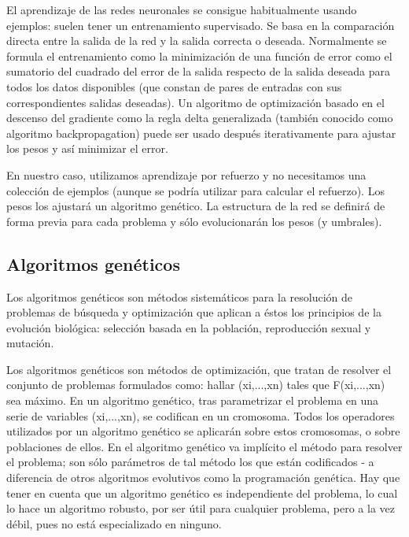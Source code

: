 \documentclass[a4paper,11pt]{article}
\begin{document}
 El aprendizaje de las redes neuronales se consigue habitualmente usando ejemplos: suelen tener un entrenamiento supervisado. Se basa en la comparaci\'on directa entre la salida de la red y la salida correcta o deseada. Normalmente se formula el entrenamiento como la minimizaci\'on de una funci\'on de error como el sumatorio del cuadrado del error de la salida respecto de la salida deseada para todos los datos disponibles (que constan de pares de entradas con sus correspondientes salidas deseadas). Un algoritmo de optimizaci\'on basado en el descenso del gradiente como la regla delta generalizada (tambi\'en conocido como algoritmo backpropagation) puede ser usado despu\'es iterativamente para ajustar los pesos y as\'i minimizar el error.

 En nuestro caso, utilizamos aprendizaje por refuerzo y no necesitamos una colecci\'on de ejemplos (aunque se podr\'ia utilizar para calcular el refuerzo). Los pesos los ajustar\'a un algoritmo gen\'etico. La estructura de la red se definir\'a de forma previa para cada problema y s\'olo evolucionar\'an los pesos (y umbrales).


\subsection{Algoritmos gen\'eticos}\label{basTeoGenet}

 Los algoritmos gen\'eticos son m\'etodos sistem\'aticos para la resoluci\'on de problemas de b\'usqueda y optimizaci\'on que aplican a \'estos los principios de la evoluci\'on biol\'ogica: selecci\'on basada en la poblaci\'on, reproducci\'on sexual y mutaci\'on.

 Los algoritmos gen\'eticos son m\'etodos de optimizaci\'on, que tratan de resolver el conjunto de problemas formulados como: hallar (xi,...,xn) tales que F(xi,...,xn) sea m\'aximo. En un algoritmo gen\'etico, tras parametrizar el problema en una serie de variables (xi,...,xn), se codifican en un cromosoma. Todos los operadores utilizados por un algoritmo gen\'etico se aplicar\'an sobre estos cromosomas, o sobre poblaciones de ellos. En el algoritmo gen\'etico va impl\'icito el m\'etodo para resolver el problema; son s\'olo par\'ametros de tal m\'etodo los que est\'an codificados - a diferencia de otros algoritmos evolutivos como la programaci\'on gen\'etica. Hay que tener en cuenta que un algoritmo gen\'etico es independiente del problema, lo cual lo hace un algoritmo robusto, por ser \'util para cualquier problema, pero a la vez d\'ebil, pues no est\'a especializado en ninguno.
\end{document}
